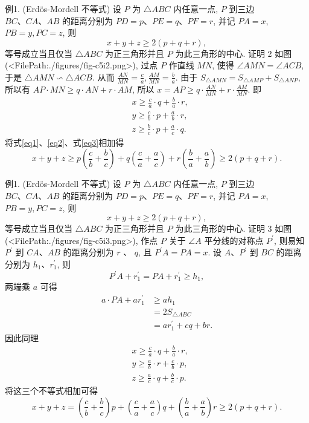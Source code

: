 例1. (Erdös-Mordell 不等式) 设 $P$ 为 $\triangle A B C$ 内任意一点, $P$ 到三边 $B C 、 C A 、 A B$ 的距离分别为 $P D=p 、 P E=q 、 P F=r$, 并记 $P A=x$, $P B=y, P C=z$, 则
$$
x+y+z \geqslant 2(p+q+r),
$$
等号成立当且仅当 $\triangle A B C$ 为正三角形并且 $P$ 为此三角形的中心.
证明 2 如图(<FilePath:./figures/fig-c5i2.png>), 过点 $P$ 作直线 $M N$, 使得 $\angle A M N=\angle A C B$, 于是 $\triangle A M N \backsim \triangle A C B$.
从而 $\frac{A N}{M N}=\frac{c}{a}, \frac{A M}{M N}=\frac{b}{a}$.
由于 $S_{\triangle A M N}=S_{\triangle A M P}+S_{\triangle A N P}$,
所以有 $A P \cdot M N \geqslant q \cdot A N+r \cdot A M$,
所以 $x=A P \geqslant q \cdot \frac{A N}{M N}+r \cdot \frac{A M}{M N}$.
即
$$
\begin{aligned}
& x \geqslant \frac{c}{a} \cdot q+\frac{b}{a} \cdot r, \label{eq1}\\
& y \geqslant \frac{c}{b} \cdot p+\frac{a}{b} \cdot r, \label{eq2}\\
& z \geqslant \frac{b}{c} \cdot p+\frac{a}{c} \cdot q . \label{eq3}
\end{aligned}
$$
将式\ref{eq1}、\ref{eq2}、式\ref{eq3}相加得
$$
x+y+z \geqslant p\left(\frac{c}{b}+\frac{b}{c}\right)+q\left(\frac{c}{a}+\frac{a}{c}\right)+r\left(\frac{b}{a}+\frac{a}{b}\right) \geqslant 2(p+q+r) .
$$



例1. (Erdös-Mordell 不等式) 设 $P$ 为 $\triangle A B C$ 内任意一点, $P$ 到三边 $B C 、 C A 、 A B$ 的距离分别为 $P D=p 、 P E=q 、 P F=r$, 并记 $P A=x$, $P B=y, P C=z$, 则
$$
x+y+z \geqslant 2(p+q+r),
$$
等号成立当且仅当 $\triangle A B C$ 为正三角形并且 $P$ 为此三角形的中心.
证明 3 如图(<FilePath:./figures/fig-c5i3.png>), 作点 $P$ 关于 $\angle A$ 平分线的对称点 $P^{\prime}$, 则易知 $P^{\prime}$ 到 $C A 、 A B$ 的距离分别为 $r$ 、 $q$, 且 $P^{\prime} A=P A=x$.
设 $A 、 P^{\prime}$ 到 $B C$ 的距离分别为 $h_1 、 r_1^{\prime}$, 则
$$
P^{\prime} A+r_1^{\prime}=P A+r_1^{\prime} \geqslant h_1,
$$
两端乘 $a$ 可得
$$
\begin{aligned}
a \cdot P A+a r_1^{\prime} & \geqslant a h_1 \\
& =2 S_{\triangle A B C} \\
& =a r_1^{\prime}+c q+b r .
\end{aligned}
$$
因此同理
$$
\begin{aligned}
& x \geqslant \frac{c}{a} \cdot q+\frac{b}{a} \cdot r, \\
& y \geqslant \frac{a}{b} \cdot r+\frac{c}{b} \cdot p, \\
& z \geqslant \frac{a}{c} \cdot q+\frac{b}{c} \cdot p .
\end{aligned}
$$
将这三个不等式相加可得
$$
x+y+z=\left(\frac{c}{b}+\frac{b}{c}\right) p+\left(\frac{c}{a}+\frac{a}{c}\right) q+\left(\frac{b}{a}+\frac{a}{b}\right) r \geqslant 2(p+q+r) .
$$



